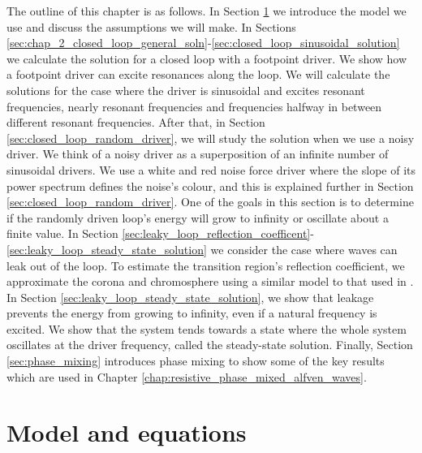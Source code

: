 The outline of this chapter is as follows. 
In Section \ref{sec:chap_2_model_and_equations} we introduce the model we use and discuss the assumptions we will make. In Sections \ref{sec:chap_2_closed_loop_general_soln}-\ref{sec:closed_loop_sinusoidal_solution} we calculate the solution for a closed loop with a footpoint driver. We show how a footpoint driver can excite resonances along the loop. We will calculate the solutions for the case where the driver is sinusoidal and excites resonant frequencies, nearly resonant frequencies and frequencies halfway in between different resonant frequencies.
After that, in Section \ref{sec:closed_loop_random_driver}, we will study the solution when we use a noisy driver. We think of a noisy driver as a superposition of an infinite number of sinusoidal drivers. We use a white and red noise force driver where the slope of its power spectrum defines the noise's colour, and this is explained further in Section \ref{sec:closed_loop_random_driver}. One of the goals in this section is to determine if the randomly driven loop's energy will grow to infinity or oscillate about a finite value. 
In Section \ref{sec:leaky_loop_reflection_coefficent}-\ref{sec:leaky_loop_steady_state_solution} we consider the case where waves can leak out of the loop. To estimate the transition region's reflection coefficient, we approximate the corona and chromosphere using a similar model to that used in \citet{Hollweg1984b}. In Section \ref{sec:leaky_loop_steady_state_solution}, we show that leakage prevents the energy from growing to infinity, even if a natural frequency is excited. We show that the system tends towards a state where the whole system oscillates at the driver frequency, called the steady-state solution. Finally, Section \ref{sec:phase_mixing} introduces phase mixing to show some of the key results which are used in Chapter \ref{chap:resistive_phase_mixed_alfven_waves}.


\section{Model and equations}
\label{sec:chap_2_model_and_equations}

